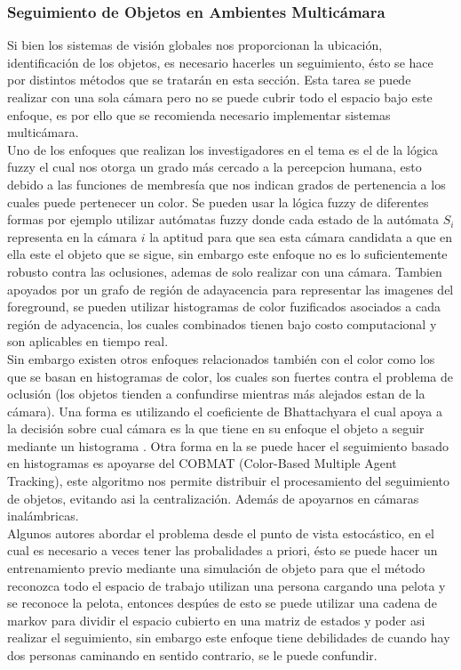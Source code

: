 \documentclass[conference]{IEEEtran}
\begin{document}
\subsubsection{\textbf{Seguimiento de Objetos en Ambientes Multic\'amara}}
Si bien los sistemas de visi\'on globales nos proporcionan la ubicaci\'on, identificaci\'on de los objetos, es necesario hacerles un seguimiento, \'esto se hace por distintos m\'etodos que se tratar\'an en esta secci\'on. Esta tarea se puede realizar con una sola c\'amara pero no se puede cubrir todo el espacio bajo este enfoque, es por ello que se recomienda necesario implementar sistemas multic\'amara.\\

Uno de los enfoques que realizan los investigadores en el tema es el de la l\'ogica fuzzy el cual nos otorga un grado m\'as cercado a la percepcion humana, esto debido a las funciones de membres\'ia que nos indican grados de pertenencia  a los cuales puede pertenecer un color. Se pueden usar la l\'ogica fuzzy de diferentes formas por ejemplo utilizar aut\'omatas fuzzy donde cada estado de la aut\'omata $S_i$ representa en la c\'amara $i$ la aptitud para que sea esta c\'amara candidata a que en ella este el objeto que se sigue\cite{morioka_mul}, sin embargo este enfoque no es lo suficientemente robusto contra las oclusiones, ademas de solo realizar con una c\'amara. Tambien apoyados por un grafo de regi\'on de adayacencia para representar las imagenes del foreground, se pueden utilizar histogramas de color fuzificados asociados a cada regi\'on de adyacencia, los cuales combinados tienen bajo costo computacional y son aplicables en tiempo real\cite{hossiein_mul}.\\
Sin embargo existen otros enfoques relacionados tambi\'en  con el color como los que se basan en  histogramas de color, los cuales son fuertes contra el problema de oclusi\'on (los objetos tienden a confundirse mientras m\'as alejados estan de la c\'amara). Una forma es utilizando el coeficiente de Bhattachyara el cual apoya a la decisi\'on sobre cual c\'amara es la que tiene en su enfoque el objeto a seguir mediante un histograma \cite{nummiaro_mot}. Otra forma en la se puede hacer el seguimiento basado en histogramas es apoyarse del COBMAT (Color-Based Multiple Agent Tracking), este algoritmo nos permite distribuir el procesamiento del seguimiento de objetos, evitando asi la centralizaci\'on. Adem\'as de apoyarnos en c\'amaras inal\'ambricas\cite{oto_mul}.  \\
Algunos autores abordar el problema desde el punto de vista estoc\'astico,  en el cual es necesario a veces tener las probalidades a priori, \'esto se puede hacer un entrenamiento previo mediante una simulaci\'on de objeto para que el m\'etodo reconozca todo el espacio de trabajo utilizan una persona cargando una pelota y se reconoce la pelota, entonces desp\'ues de esto se puede utilizar una cadena de markov para dividir el espacio cubierto en una matriz de estados  y poder asi realizar el seguimiento\cite{Dick_mot}, sin embargo este enfoque tiene debilidades de cuando hay dos personas caminando en sentido contrario, se le puede confundir. \\
\end{document}
